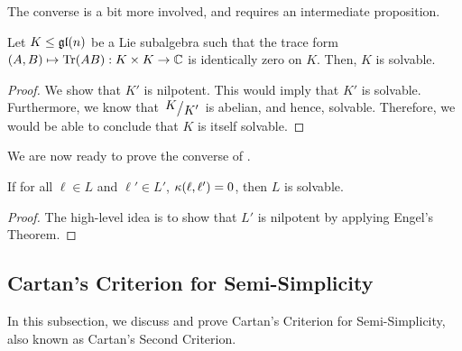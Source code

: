 The converse is a bit more involved, and requires an intermediate proposition.

\begin{proposition}
    Let $K \leq \mathfrak{gl}\!\left( n \right)$ be a Lie subalgebra such that the trace form $\left( A, B \right) \mapsto \operatorname{Tr}\!\left( AB \right) : K \times K \to \mathbb{C}$ is identically zero on $K$. Then, $K$ is solvable.
\end{proposition}
\begin{proof}
    We show that $K'$ is nilpotent. This would imply that $K'$ is solvable. Furthermore, we know that $\quotient{K}{K'}$ is abelian, and hence, solvable. Therefore, we would be able to conclude that $K$ is itself solvable. %

    
\end{proof}

We are now ready to prove the converse of .

\begin{boxlemma}
    If for all $\ell \in L$ and $\ell' \in L'$, $\kappa\!\left( \ell, \ell' \right) = 0$, then $L$ is solvable.
\end{boxlemma}
\begin{proof}
    The high-level idea is to show that $L'$ is nilpotent by applying Engel's Theorem.

    \sorry
\end{proof}

\subsection{Cartan's Criterion for Semi-Simplicity}

In this subsection, we discuss and prove Cartan's Criterion for Semi-Simplicity, also known as Cartan's Second Criterion.

